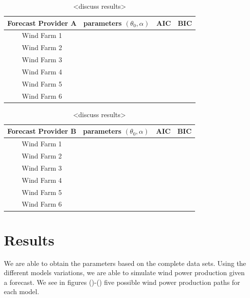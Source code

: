 \documentclass[10pt,twocolumn,letterpaper]{article}
\begin{document}
\begin{table}[]
\centering
\begin{tabular}{|c|c|c|c|}
\hline
Forecast Provider A & parameters $(\theta_0, \alpha)$ & AIC & BIC \\ \hline
Wind Farm 1         &                                 &     &     \\ \hline
Wind Farm 2         &                                 &     &     \\ \hline
Wind Farm 3         &                                 &     &     \\ \hline
Wind Farm 4         &                                 &     &     \\ \hline
Wind Farm 5         &                                 &     &     \\ \hline
Wind Farm 6         &                                 &     &     \\ \hline
\end{tabular}
\caption{<discuss results>}
\label{tab:disagregated_data}
\end{table}

\begin{table}[]
\centering
\begin{tabular}{|c|c|c|c|}
\hline
Forecast Provider B & parameters $(\theta_0, \alpha)$ & AIC & BIC \\ \hline
Wind Farm 1         &                                 &     &     \\ \hline
Wind Farm 2         &                                 &     &     \\ \hline
Wind Farm 3         &                                 &     &     \\ \hline
Wind Farm 4         &                                 &     &     \\ \hline
Wind Farm 5         &                                 &     &     \\ \hline
Wind Farm 6         &                                 &     &     \\ \hline
\end{tabular}
\caption{\textless{}discuss results\textgreater{}}
\label{tab:disagregated_data_B}
\end{table}

\section{Results}
 We are able to obtain the parameters based on the complete data sets. Using the different models variations, we are able to simulate wind power production given a forecast. We see in figures ()-()
five possible wind power production paths for each model.\\
\end{document}
